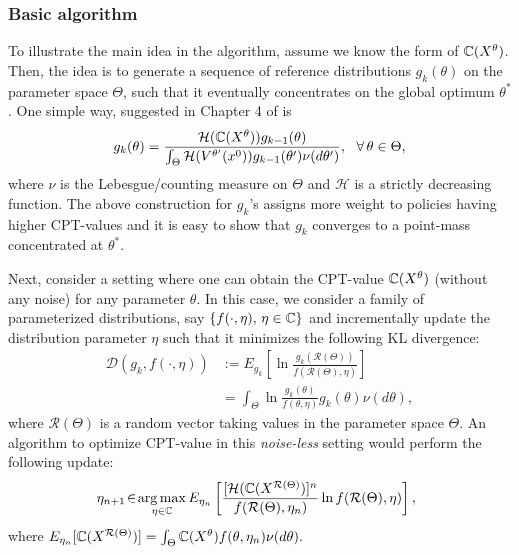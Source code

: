 \subsubsection*{Basic algorithm}
To illustrate the main idea in the algorithm, assume we know the form of $\mathbb{C}(X^{\theta})$. Then, the idea is to generate a sequence of reference distributions $g_k(\theta)$ on the parameter space $\Theta$, such that it eventually concentrates on the global optimum $\theta^*$. One simple way, suggested in Chapter 4 of \cite{chang2013simulation} is
\begin{equation}
\label{eqn:naive}
g_{k}(\theta)=
\frac{\mathcal{H}(\mathbb{C}(X^{\theta}))g_{k-1}(\theta)}
{\int_{\Theta}\mathcal{H}(V^{\theta'}(x^0))g_{k-1}(\theta')\nu(d\theta')},
~~\forall\, \theta \in \Theta,
\end{equation}
where $\nu$ is the Lebesgue/counting measure on $\Theta$ and $\mathcal{H}$ is a strictly decreasing function. The above construction for $g_k$'s assigns more weight to policies having higher CPT-values and it is easy to show that $g_k$ converges to a point-mass concentrated at $\theta^*$.

Next, consider a setting where one can obtain the CPT-value $\mathbb{C}(X^{\theta})$ (without any noise) for any parameter $\theta$. In this case, we consider a family of parameterized distributions, say $\{f(\cdot,\eta),\,\eta\in \mathbb{C} \}$ and incrementally update the distribution parameter $\eta$ such that it minimizes the following KL divergence:
\begin{align}
\label{eqn:kl}
\mathcal{D}(g_k,f(\cdot,\eta))&:=E_{g_k}\left[\ln \frac{g_{k}(\mathcal{R}(\Theta))}{f(\mathcal{R}(\Theta),\eta)}\right]\\
&=\int_{\Theta} \ln \frac{g_{k}(\theta)}{f(\theta,\eta)}g_{k}(\theta)\nu(d\theta), \nonumber
\end{align}
where $\mathcal{R}(\Theta)$ is a random vector taking values in the parameter space $\Theta$. 
An algorithm to optimize CPT-value in this \textit{noise-less} setting would perform the following update:
\begin{align}
 \label{eqn:interior}
\hspace{-0.5em}\eta_{n+1} \!\in\! \mathop{\rm arg\,max}_{\eta \in \mathbb{C}}
E_{\eta_n}\left[\frac{[\mathcal{H}(\mathbb{C}(X^{\mathcal{R}(\Theta)})]^{n}}
{f(\mathcal{R}(\Theta),\eta_{n})}
\ln f(\mathcal{R}(\Theta),\eta)\right],
\end{align}
where $E_{\eta_n}[\mathbb{C}(X^{\mathcal{R}(\Theta)})]=\int_{\Theta} \mathbb{C}(X^{\theta})f(\theta,\eta_n)\nu(d\theta).$



